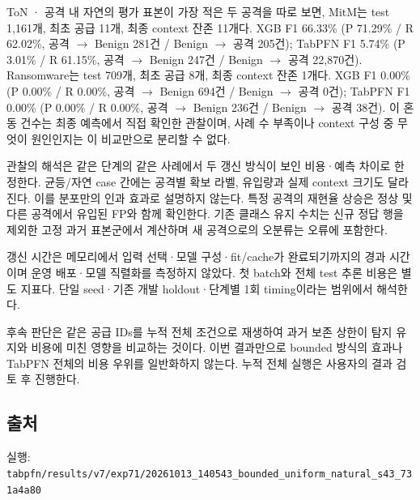 ToN · 공격 내 자연의 평가 표본이 가장 적은 두 공격을 따로 보면, MitM는 test 1,161개, 최초 공급 11개, 최종 context 잔존 11개다. XGB F1 66.33\% (P 71.29\% /\allowbreak{} R 62.02\%, 공격 \ensuremath{\rightarrow} Benign 281건 /\allowbreak{} Benign \ensuremath{\rightarrow} 공격 205건); TabPFN F1 5.74\% (P 3.01\% /\allowbreak{} R 61.15\%, 공격 \ensuremath{\rightarrow} Benign 247건 /\allowbreak{} Benign \ensuremath{\rightarrow} 공격 22,870건). Ransomware는 test 709개, 최초 공급 8개, 최종 context 잔존 1개다. XGB F1 0.00\% (P 0.00\% /\allowbreak{} R 0.00\%, 공격 \ensuremath{\rightarrow} Benign 694건 /\allowbreak{} Benign \ensuremath{\rightarrow} 공격 0건); TabPFN F1 0.00\% (P 0.00\% /\allowbreak{} R 0.00\%, 공격 \ensuremath{\rightarrow} Benign 236건 /\allowbreak{} Benign \ensuremath{\rightarrow} 공격 38건). 이 혼동 건수는 최종 예측에서 직접 확인한 관찰이며, 사례 수 부족이나 context 구성 중 무엇이 원인인지는 이 비교만으로 분리할 수 없다.

관찰의 해석은 같은 단계의 같은 사례에서 두 갱신 방식이 보인 비용·예측 차이로 한정한다. 균등/\allowbreak{}자연 case 간에는 공격별 확보 라벨, 유입량과 실제 context 크기도 달라진다. 이를 분포만의 인과 효과로 설명하지 않는다. 특정 공격의 재현율 상승은 정상 및 다른 공격에서 유입된 FP와 함께 확인한다. 기존 클래스 유지 수치는 신규 정답 행을 제외한 고정 과거 표본군에서 계산하며 새 공격으로의 오분류는 오류에 포함한다.

갱신 시간은 메모리에서 입력 선택·모델 구성·fit/\allowbreak{}cache가 완료되기까지의 경과 시간이며 운영 배포·모델 직렬화를 측정하지 않았다. 첫 batch와 전체 test 추론 비용은 별도 지표다. 단일 seed·기존 개발 holdout·단계별 1회 timing이라는 범위에서 해석한다.

후속 판단은 같은 공급 IDs를 누적 전체 조건으로 재생하여 과거 보존 상한이 탐지 유지와 비용에 미친 영향을 비교하는 것이다. 이번 결과만으로 bounded 방식의 효과나 TabPFN 전체의 비용 우위를 일반화하지 않는다. 누적 전체 실행은 사용자의 결과 검토 후 진행한다.

\subsection{출처}
\par\noindent \textbullet\enspace 실행: \texttt{tabpfn/\allowbreak{}\allowbreak{}r\allowbreak{}esults/\allowbreak{}\allowbreak{}v\allowbreak{}7/\allowbreak{}\allowbreak{}exp71/\allowbreak{}\allowbreak{}20261013\allowbreak{}\_\allowbreak{}\allowbreak{}140543\_\allowbreak{}\allowbreak{}bounded\_\allowbreak{}\allowbreak{}uniform\_\allowbreak{}\allowbreak{}natural\_\allowbreak{}\allowbreak{}s43\_\allowbreak{}\allowbreak{}731a\allowbreak{}4a80}


